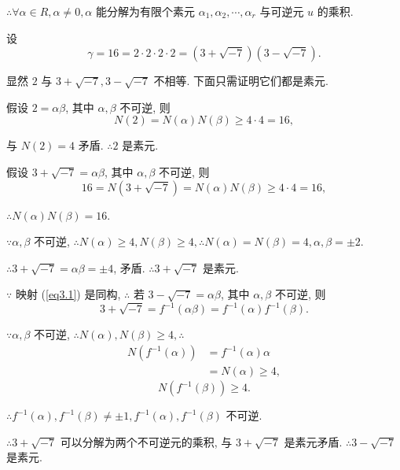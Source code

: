 \documentclass[UTF8]{ctexart}
\begin{document}
\begin{example}
    $\therefore\forall\alpha\in R,\alpha\neq0,\alpha$ 能分解为有限个素元 $\alpha_1,\alpha_2,\cdots,\alpha_r$ 与可逆元 $u$ 的乘积.

    设
    \[\gamma=16=2\cdot2\cdot2\cdot2=(3+\sqrt{-7})(3-\sqrt{-7}).\]

    显然 $2$ 与 $3+\sqrt{-7},3-\sqrt{-7}$ 不相等. 下面只需证明它们都是素元.

    假设 $2=\alpha\beta$, 其中 $\alpha,\beta$ 不可逆, 则
    \[N(2)=N(\alpha)N(\beta)\geq4\cdot4=16,\]

    与 $N(2)=4$ 矛盾. $\therefore 2$ 是素元.
    
    假设 $3+\sqrt{-7}=\alpha\beta$, 其中 $\alpha,\beta$ 不可逆, 则
    \[16=N(3+\sqrt{-7})=N(\alpha)N(\beta)\geq4\cdot4=16,\]

    $\therefore N(\alpha)N(\beta)=16$.

    $\because\alpha,\beta$ 不可逆, $\therefore N(\alpha)\geq4,N(\beta)\geq4,\therefore N(\alpha)=N(\beta)=4,\alpha,\beta=\pm2$.

    $\therefore3+\sqrt{-7}=\alpha\beta=\pm4$, 矛盾. $\therefore3+\sqrt{-7}$ 是素元.

    $\because$ 映射 (\ref{eq3.1}) 是同构, $\therefore$ 若 $3-\sqrt{-7}=\alpha\beta$, 其中 $\alpha,\beta$ 不可逆, 则
    \[3+\sqrt{-7}=f^{-1}(\alpha\beta)=f^{-1}(\alpha)f^{-1}(\beta).\]

    $\because\alpha,\beta$ 不可逆, $\therefore N(\alpha),N(\beta)\geq4,\therefore$
    \begin{align*}
        N(f^{-1}(\alpha)) & =f^{-1}(\alpha)\alpha \\
        & =N(\alpha)\geq4,
    \end{align*}
    \[N(f^{-1}(\beta))\geq4.\]

    $\therefore f^{-1}(\alpha),f^{-1}(\beta)\neq\pm1,f^{-1}(\alpha),f^{-1}(\beta)$ 不可逆.

    $\therefore3+\sqrt{-7}$ 可以分解为两个不可逆元的乘积, 与 $3+\sqrt{-7}$ 是素元矛盾. $\therefore3-\sqrt{-7}$ 是素元.
\end{example}
\end{document}
